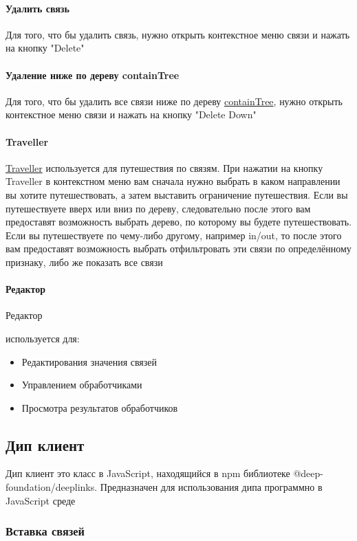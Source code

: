 \documentclass{article}
\begin{document}
\paragraph{Удалить связь}
Для того, что бы удалить связь, нужно открыть контекстное меню связи и нажать
на кнопку "Delete"
\paragraph{Удаление ниже по дереву containTree}\hypertarget{containTree.Deletion.Example}{}
Для того, что бы удалить все связи ниже по дереву
\hyperlink{containTree.Def}{containTree}, нужно открыть контекстное меню связи
и нажать на кнопку "Delete Down"
\paragraph*{Traveller}
\hyperlink{Traveller.Def}{Traveller} используется для путешествия по связям. 
При нажатии на кнопку Traveller в контекстном меню вам сначала нужно выбрать в каком направлении вы хотите путешествовать, а затем выставить ограничение путешествия. 
Если вы путешествуете вверх или вниз по дереву, следовательно после этого вам предоставят возможность выбрать дерево, по которому вы будете путешествовать.
Если вы путешествуете по чему-либо другому, например in/out, то после этого вам предоставят возможность выбрать отфильтровать эти связи по определённому признаку, либо же показать все связи
\paragraph*{Редактор}
\hypertarget{Editor.Def}{Редактор} используется для:
\begin{itemize}
  \item Редактирования значения связей
  \item Управлением обработчиками
  \item Просмотра результатов обработчиков
\end{itemize}

\subsection{Дип клиент}
Дип клиент это класс в JavaScript, находящийся в npm библиотеке
@deep-foundation/deeplinks. Предназначен для использования дипа
программно в JavaScript среде

\subsubsection{Вставка связей}
\end{document}
